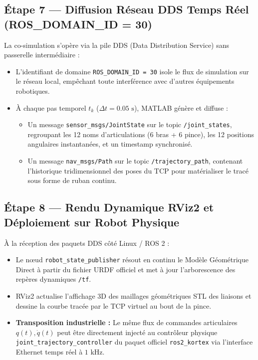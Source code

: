 \documentclass[11pt,a4paper]{report}
\begin{document}
\subsection{Étape 7 — Diffusion Réseau DDS Temps Réel (ROS\_DOMAIN\_ID = 30)}
La co-simulation s'opère via la pile DDS (Data Distribution Service) sans passerelle intermédiaire :
\begin{itemize}
    \item L'identifiant de domaine \texttt{ROS\_DOMAIN\_ID = 30} isole le flux de simulation sur le réseau local, empêchant toute interférence avec d'autres équipements robotiques.
    \item À chaque pas temporel $t_k$ ($\Delta t = 0.05\text{ s}$), MATLAB génère et diffuse :
    \begin{itemize}
        \item Un message \texttt{sensor\_msgs/JointState} sur le topic \texttt{/joint\_states}, regroupant les 12 noms d'articulations (6 bras + 6 pince), les 12 positions angulaires instantanées, et un timestamp synchronisé.
        \item Un message \texttt{nav\_msgs/Path} sur le topic \texttt{/trajectory\_path}, contenant l'historique tridimensionnel des poses du TCP pour matérialiser le tracé sous forme de ruban continu.
    \end{itemize}
\end{itemize}

\subsection{Étape 8 — Rendu Dynamique RViz2 et Déploiement sur Robot Physique}
À la réception des paquets DDS côté Linux / ROS 2 :
\begin{itemize}
    \item Le nœud \texttt{robot\_state\_publisher} résout en continu le Modèle Géométrique Direct à partir du fichier URDF officiel et met à jour l'arborescence des repères dynamiques \texttt{/tf}.
    \item RViz2 actualise l'affichage 3D des maillages géométriques STL des liaisons et dessine la courbe tracée par le TCP virtuel au bout de la pince.
    \item \textbf{Transposition industrielle :} Le même flux de commandes articulaires $q(t), \dot{q}(t)$ peut être directement injecté au contrôleur physique \texttt{joint\_trajectory\_controller} du paquet officiel \texttt{ros2\_kortex} via l'interface Ethernet temps réel à $1\text{ kHz}$.
\end{itemize}
\end{document}
